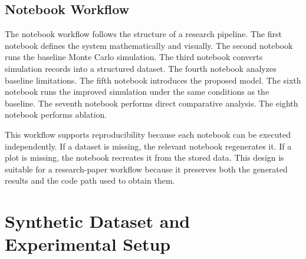 \documentclass[journal]{IEEEtran}
\begin{document}
\subsection{Notebook Workflow}

The notebook workflow follows the structure of a research pipeline. The first notebook defines the system mathematically and visually. The second notebook runs the baseline Monte Carlo simulation. The third notebook converts simulation records into a structured dataset. The fourth notebook analyzes baseline limitations. The fifth notebook introduces the proposed model. The sixth notebook runs the improved simulation under the same conditions as the baseline. The seventh notebook performs direct comparative analysis. The eighth notebook performs ablation.

This workflow supports reproducibility because each notebook can be executed independently. If a dataset is missing, the relevant notebook regenerates it. If a plot is missing, the notebook recreates it from the stored data. This design is suitable for a research-paper workflow because it preserves both the generated results and the code path used to obtain them.

\begin{table}[H]
\centering
\caption{Mapping between notebooks and research outputs.}
\label{tab:notebooks}
\end{table}

\section{Synthetic Dataset and Experimental Setup}
\label{sec:experiments}
\end{document}
